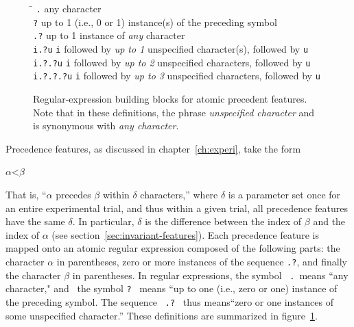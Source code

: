{\begin{figure}[t]
\begin{mdframed}
\begin{tabbing}
 \hspace{1in}  \=  \hspace{5.5in} \kill
\texttt{.} \> any character\\
\texttt{?} \> up to 1 (i.e., 0 or 1) instance(s) of the preceding symbol \\
\texttt{.?} \> up to 1 instance of \emph{any} character\\
\texttt{i.?u}  \>\texttt{i} followed by \emph{up to 1} unspecified character(s), followed by \texttt{u}\\
\texttt{i.?.?u}  \>\texttt{i} followed by \emph{up to 2} unspecified characters, followed by \texttt{u}\\
\texttt{i.?.?.?u}  \>\texttt{i} followed by \emph{up to 3} unspecified characters, followed by \texttt{u}\\
\end{tabbing}
\caption{Regular-expression building blocks for atomic precedent features. Note that in these definitions, the phrase \emph{unspecified character} %
and is synonymous with \emph{any character}. }
\end{mdframed}
\label{fig:regex-defs}
\end{figure}

Precedence features, as discussed in chapter~\ref{ch:experi}, take the form
\begin{center}
$\alpha\text{<}\beta$
\end{center}
That is, ``$\alpha$ precedes $\beta$ within $\delta$ characters,'' where $\delta$ is 
a parameter set once for an entire experimental trial, and thus within a given trial, all precedence features
have the same $\delta$.  In particular, $\delta$ is the difference between the 
index of $\beta$ and the index of $\alpha$ (see section~\ref{sec:invariant-features}).
Each precedence feature is mapped onto an atomic regular expression composed of the following parts:
the character $\alpha$ in parentheses, zero or more instances of the sequence \texttt{.?},  and finally
the character $\beta$ in parentheses. In regular expressions, the symbol \, \texttt{.} \,means ``any character," and 
\, the symbol \texttt{?} \, means ``up to one (i.e., zero or one) instance of the preceding symbol. The sequence \, \texttt{.?} \, 
thus means``zero or one instances of some unspecified character.'' These definitions are summarized in figure~\ref{fig:regex-defs}.

}
